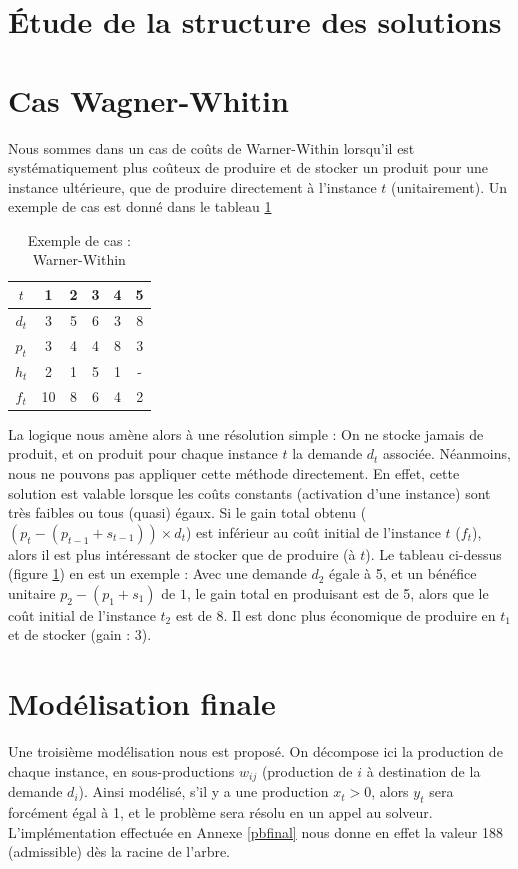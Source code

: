 \documentclass[a4paper,11pt,twoside]{report}
\begin{document}
\section{Étude de la structure des solutions}



\section{Cas Wagner-Whitin}
Nous sommes dans un cas de coûts de Warner-Within lorsqu'il est systématiquement plus coûteux de produire et de stocker un produit pour une instance ultérieure, que de produire directement à l'instance $t$ (unitairement).
Un exemple de cas est donné dans le tableau \ref{warner1}
\begin{table}[h]
  \centering
 \begin{tabular}{|c|ccccc|}
\hline
$t$&1&2&3&4&5\\\hline\hline
$d_t$&3&5&6&3&8\\
$p_t$&3&4&4&8&3\\
$h_t$&2&1&5&1&-\\
$f_t$&10&8&6&4&2\\\hline
\end{tabular}
 \caption{Exemple de cas : Warner-Within}
 \label{warner1}
\end{table}

La logique nous amène alors à une résolution simple : On ne stocke jamais de produit, et on produit pour chaque instance $t$ la demande $d_t$ associée. Néanmoins, nous ne pouvons pas appliquer cette méthode directement.
En effet, cette solution est valable lorsque les coûts constants (activation d'une instance) sont très faibles ou tous (quasi) égaux. Si le gain total obtenu ($(p_t-(p_{t-1}+s_{t-1}))\times d_t$) est inférieur au coût initial de l'instance $t$ ($f_t$), alors il est plus intéressant de stocker que de produire (à $t$).
Le tableau ci-dessus (figure \ref{warner1}) en est un exemple : Avec une demande $d_2$ égale à 5, et un bénéfice unitaire $p_2-(p_1+s_1)$ de $1$, le gain total en produisant est de 5, alors que le coût initial de l'instance $t_2$ est de 8. Il est donc plus économique de produire en $t_1$ et de stocker (gain : 3).

\section{Modélisation finale}
Une troisième modélisation nous est proposé. On décompose ici la production de chaque instance, en sous-productions $w_{ij}$ (production de $i$ à destination de la demande $d_i$).
Ainsi modélisé, s'il y a une production $x_t>0$, alors $y_t$ sera forcément égal à 1, et le problème sera résolu en un appel au solveur. L'implémentation effectuée en Annexe \ref{pbfinal} nous donne en effet la valeur 188 (admissible) dès la racine de l'arbre.
\end{document}
